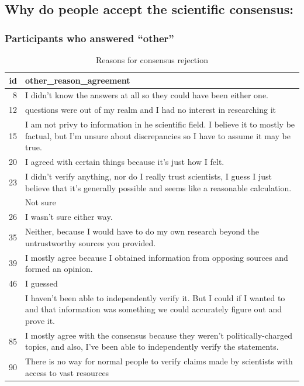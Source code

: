 \documentclass[
  doc,floatsintext]{apa6}
\begin{document}
\subsection{Why do people accept the scientific consensus:}\label{why-do-people-accept-the-scientific-consensus-1}

\subsubsection{Participants who answered ``other''}\label{participants-who-answered-other-2}

\begin{longtable}[t]{>{}r>{\raggedright\arraybackslash}p{30em}}
\caption{\label{tab:exp4-other-reasons-acceptance}Reasons for consensus rejection}\\
\toprule
id & other\_reason\_agreement\\
\midrule
8 & I didn’t know the answers at all so they could have been either one.\\
12 & questions were out of my realm and I had no interest in researching it\\
15 & I am not privy to information in he scientific field. I believe it to mostly be factual, but I'm unsure about discrepancies so I have to assume it may be true.\\
20 & I agreed with certain things because it's just how I felt.\\
23 & I didn't verify anything, nor do I really trust scientists, I guess I just believe that it's generally possible and seems like a reasonable calculation.\\
\addlinespace
25 & Not sure\\
26 & I wasn't sure either way.\\
35 & Neither, because I would have to do my own research beyond the untrustworthy sources you provided.\\
39 & I mostly agree because I obtained information from opposing sources and formed an opinion.\\
46 & I guessed\\
\addlinespace
63 & I haven't been able to independently verify it.  But I could if I wanted to and that information was something we could accurately figure out and prove it.\\
85 & I mostly agree with the consensus because they weren't politically-charged topics, and also, I've been able to independently verify the statements.\\
90 & There is no way for normal people to verify claims made by scientists with access to vast resources\\

\end{longtable}
\end{document}
